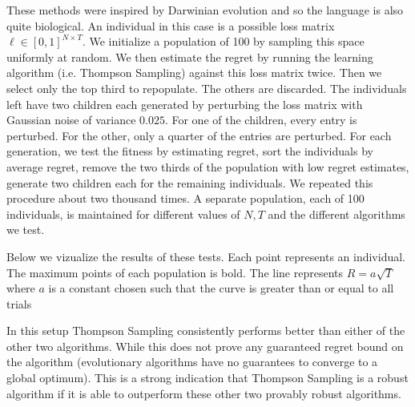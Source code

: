 \documentclass[10pt,a4paper]{article} %
\begin{document}
	These methods were inspired by Darwinian evolution and so the language is also quite biological.  An individual in this case is a possible loss matrix $\ell \in \left[ 0, 1 \right]^{N \times T} $.  We initialize a population of 100 by sampling this space uniformly at random.  We then estimate the regret by running the learning algorithm (i.e. Thompson Sampling) against this loss matrix twice.  Then we select only the top third to repopulate.  The others are discarded.  The individuals left have two children each generated by perturbing the loss matrix with Gaussian noise of variance $0.025$.  For one of the children, every entry is perturbed. For the other, only a quarter of the entries are perturbed.  For each generation, we test the fitness by estimating regret, sort the individuals by average regret, remove the two thirds of the population with low regret estimates, generate two children each for the remaining individuals.  We repeated this procedure about two thousand times.  A separate population, each of 100 individuals, is maintained for different values of $N, T$ and the different algorithms we test.
		
	Below we vizualize the results of these tests.  Each point represents an individual.  The maximum points of each population is bold.  The line represents $R = a \sqrt{T}$ where $a$ is a constant chosen such that the curve is greater than or equal to all trials 
	
		
	\begin{figure}[h!]
	\end{figure}

	In this setup Thompson Sampling consistently performs better than either of the other two algorithms.  While this does not prove any guaranteed regret bound on the algorithm (evolutionary algorithms have no guarantees to converge to a global optimum).  This is a strong indication that Thompson Sampling is a robust algorithm if it is able to outperform these other two provably robust algorithms.
\end{document}
